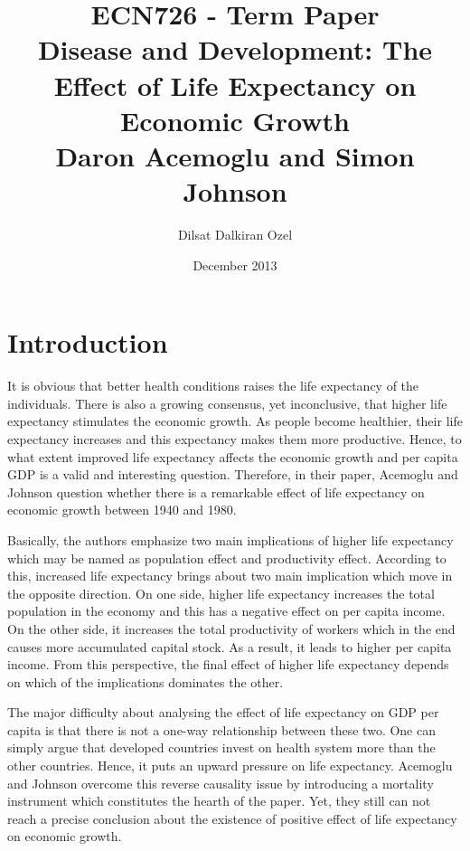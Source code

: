 \documentclass[11pt]{article}
\begin{document}
\title{ECN726 - Term Paper\\ Disease and Development: The Effect of Life Expectancy on Economic Growth\\ Daron Acemoglu and Simon Johnson}
\author{Dilsat Dalkiran Ozel}
\date{December 2013}
\maketitle
\section*{Introduction}
It is obvious that better health conditions raises the life expectancy of the individuals. There is also a growing consensus, yet inconclusive, that higher life expectancy stimulates the economic growth. As people become healthier, their life expectancy increases and this expectancy makes them more productive. Hence, to what extent improved life expectancy affects the economic growth and per capita GDP is a valid and interesting question. Therefore, in their paper, Acemoglu and Johnson question whether there is a remarkable effect of life expectancy on economic growth between 1940 and 1980. 

Basically, the authors emphasize two main implications of higher life expectancy which may be named as population effect and productivity effect. According to this, increased life expectancy brings about two main implication which move in the opposite direction. On one side, higher life expectancy increases the total population in the economy and this has a negative effect on per capita income. On the other side, it increases the total productivity of workers which in the end causes more accumulated capital stock. As a result, it leads to higher per capita income. From this perspective, the final effect of higher life expectancy depends on which of the implications dominates the other.

The major difficulty about analysing the effect of life expectancy on GDP per capita is that there is not a one-way relationship between these two. One can simply argue that developed countries invest on health system more than the other countries. Hence, it puts an upward pressure on life expectancy. Acemoglu and Johnson overcome this reverse causality issue by introducing a mortality instrument which constitutes the hearth of the paper. Yet, they still can not reach a precise conclusion about the existence of positive effect of life expectancy on economic growth. 
\end{document}

